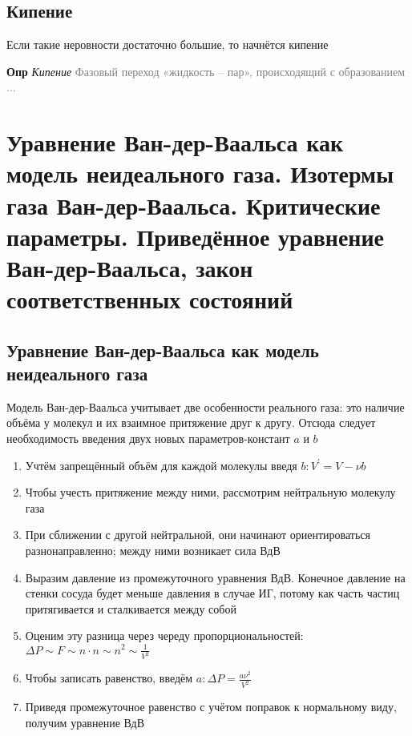 \documentclass[a4paper, 14pt]{article}
\begin{document}
    \subsection{Кипение}

    Если такие неровности достаточно большие, то начнётся кипение

    \textbf{Опр} \textit{Кипение} \textcolor{gray}{Фазовый переход «жидкость -- пар», происходящий с образованием ...}

    \section{Уравнение Ван-дер-Ваальса как модель неидеального газа.
    Изотермы газа Ван-дер-Ваальса.
    Критические параметры.
    Приведённое уравнение Ван-дер-Ваальса, закон соответственных состояний}

    \subsection{Уравнение Ван-дер-Ваальса как модель неидеального газа}

    Модель Ван-дер-Ваальса учитывает две особенности реального газа: это наличие объёма у молекул и их взаимное
    притяжение друг к другу.
    Отсюда следует необходимость введения двух новых параметров-констант $a$ и $b$

    \begin{enumerate}
        \item Учтём запрещённый объём для каждой молекулы введя $b: V^{'} = V - \nu b$
        \item Чтобы учесть притяжение между ними, рассмотрим нейтральную молекулу газа
        \item При сближении с другой нейтральной, они начинают ориентироваться разнонаправленно; между ними возникает
        сила ВдВ
        \item Выразим давление из промежуточного уравнения ВдВ.
        Конечное давление на стенки сосуда будет меньше давления в случае ИГ, потому как часть частиц притягивается и
        сталкивается между собой
        \item Оценим эту разница через череду пропорциональностей: $\Delta P \sim F \sim n \cdot n \sim n^2 \sim \frac{1}{V^2}$
        \item Чтобы записать равенство, введём $a: \Delta P = \frac{a \nu^2}{V^2}$
        \item Приведя промежуточное равенство с учётом поправок к нормальному виду, получим уравнение ВдВ
    \end{enumerate}
\end{document}
